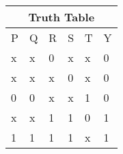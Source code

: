 \label{table-4}
\begin{tabular}{|p{1cm}|p{1cm}|p{1cm}|p{1cm}|p{1cm}|p{1cm}|}                                                         
	\hline                                               
	\multicolumn{6}{|c|}{Truth Table}\\                                                                      
	\hline                                               
	P& Q& R& S& T& Y\\                                                                                       
	\hline                                               
	x& x& 0& x& x& 0\\                                                                                       
	\hline                                               
	x& x& x& 0& x& 0\\                                                                                       
	\hline                                               
	0& 0& x& x& 1& 0\\                                                                                       
	\hline                                               
	x& x& 1& 1& 0& 1\\                                                                                       
	\hline                                               
	1& 1& 1& 1& x& 1\\                                                                                       
	\hline                                      
\end{tabular}
